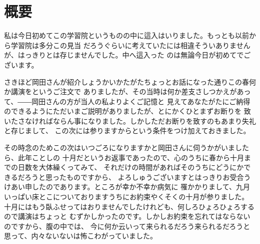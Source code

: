 \chapter{概要}
私は今日初めてこの学習院というものの中に這入はいりました。もっとも以前から学習院は多分この見当
だろうぐらいに考えていたには相違そういありませんが、はっきりとは存じませんでした。中へ這入った
のは無論今日が初めてでございます。

さきほど岡田さんが紹介しょうかいかたがたちょっとお話になった通りこの春何か講演をというご注文で
ありましたが、その当時は何か差支さしつかえがあって、――岡田さんの方が当人の私よりよくご記憶と
見えてあなたがたにご納得のできるようにただいまご説明がありましたが、とにかくひとまずお断りを
致いたさなければならん事になりました。しかしただお断りを致すのもあまり失礼と存じまして、
この次には参りますからという条件をつけ加えておきました。

その時念のためこの次はいつごろになりますかと岡田さんに伺うかがいましたら、此年ことしの
十月だというお返事であったので、心のうちに春から十月までの日数を大体繰くってみて、
それだけの時間があればそのうちにどうにかできるだろうと思ったものですから、
よろしゅうございますとはっきりお受合うけあい申したのであります。ところが幸か不幸か病気に
罹かかりまして、九月いっぱい床とこについておりますうちにお約束やくそくの十月が参りました。
十月にはもう臥ふせってはおりませんでしたけれども、何しろひょろひょろするので講演はちょっと
むずかしかったのです。しかしお約束を忘れてはならないのですから、腹の中では、
今に何か云いって来られるだろう来られるだろうと思って、内々ないないは怖こわがっていました。
